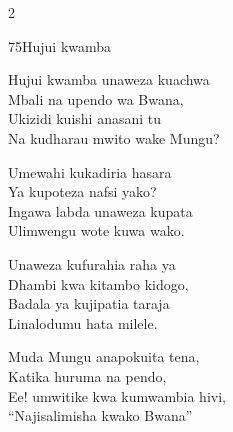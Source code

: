 \documentclass{article}
\begin{document}
\begin{multicols}{2}
\begin{hymn}{75}{Hujui kwamba}{}
\begin{stanza}
Hujui kwamba unaweza kuachwa\\
Mbali na upendo wa Bwana,\\
Ukizidi kuishi anasani tu\\
Na kudharau mwito wake Mungu?
\end{stanza}
\begin{chorus}
Umewahi kukadiria hasara\\
Ya kupoteza nafsi yako?\\
Ingawa labda unaweza kupata\\
Ulimwengu wote kuwa wako.
\end{chorus}
\begin{stanza}
Unaweza kufurahia raha ya\\
Dhambi kwa kitambo kidogo,\\
Badala ya kujipatia taraja\\
Linalodumu hata milele.
\end{stanza}
\begin{stanza}
Muda Mungu anapokuita tena,\\
Katika huruma na pendo,\\
Ee! umwitike kwa kumwambia hivi,\\
``Najisalimisha kwako Bwana''
\end{stanza}
\end{hymn}


\end{multicols}
\end{document}
